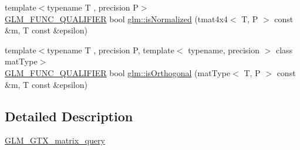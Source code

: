 \begin{DoxyCompactItemize}
\item 
{\footnotesize template$<$typename T , precision P$>$ }\\\mbox{\hyperlink{setup_8hpp_a33fdea6f91c5f834105f7415e2a64407}{G\+L\+M\+\_\+\+F\+U\+N\+C\+\_\+\+Q\+U\+A\+L\+I\+F\+I\+ER}} bool \mbox{\hyperlink{group__gtx__matrix__query_ga934b673ec0e16d79eca0ca9dbb5d6d8b}{glm\+::is\+Normalized}} (tmat4x4$<$ T, P $>$ const \&m, T const \&epsilon)
\item 
{\footnotesize template$<$typename T , precision P, template$<$ typename, precision $>$ class mat\+Type$>$ }\\\mbox{\hyperlink{setup_8hpp_a33fdea6f91c5f834105f7415e2a64407}{G\+L\+M\+\_\+\+F\+U\+N\+C\+\_\+\+Q\+U\+A\+L\+I\+F\+I\+ER}} bool \mbox{\hyperlink{group__gtx__matrix__query_gab2cb5d23df77b4e4e63ad2965acd31b3}{glm\+::is\+Orthogonal}} (mat\+Type$<$ T, P $>$ const \&m, T const \&epsilon)
\end{DoxyCompactItemize}


\subsection{Detailed Description}
\mbox{\hyperlink{group__gtx__matrix__query}{G\+L\+M\+\_\+\+G\+T\+X\+\_\+matrix\+\_\+query}} 